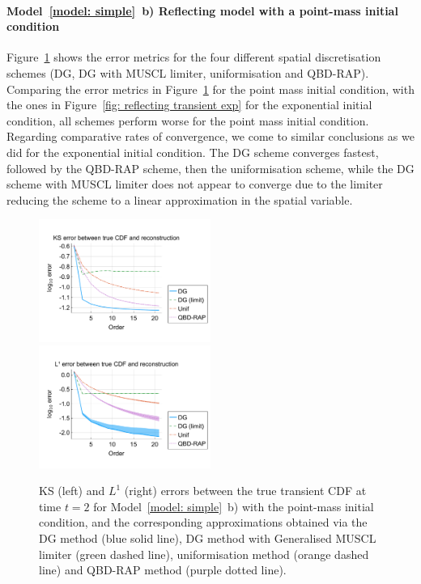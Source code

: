 \paragraph{Model~\ref{model: simple}~b) Reflecting model with a point-mass initial condition}
Figure~\ref{fig: reflecting transient pm} shows the error metrics for the four different spatial discretisation schemes (DG, DG with MUSCL limiter, uniformisation and QBD-RAP). Comparing the error metrics in Figure~\ref{fig: reflecting transient pm} for the point mass initial condition, with the ones in Figure~\ref{fig: reflecting transient exp} for the exponential initial condition, all schemes perform worse for the point mass initial condition. Regarding comparative rates of convergence, we come to similar conclusions as we did for the exponential initial condition. The DG scheme converges fastest, followed by the QBD-RAP scheme, then the uniformisation scheme, while the DG scheme with MUSCL limiter does not appear to converge due to the limiter reducing the scheme to a linear approximation in the spatial variable. %
\begin{figure}
	\centering
	\includegraphics[width=0.5\textwidth,trim={0.75cm 0.8cm 0.25cm 1.25cm},clip]{chapter6/figs/hitting_times_model/reflecting_model/transient_distribution/point_mass/ks_error_formatted.pdf}%
	\includegraphics[width=0.5\textwidth,trim={0.75cm 0.8cm 0.25cm 1.25cm},clip]{chapter6/figs/hitting_times_model/reflecting_model/transient_distribution/point_mass/l1_cdf_error_formatted.pdf}
	\caption{KS (left) and \(L^1\) (right) errors between the true transient CDF at time \(t=2\) for Model~\ref{model: simple}~b) with the point-mass initial condition, and the corresponding approximations obtained via the DG method (blue solid line), DG method with Generalised MUSCL limiter (green dashed line), uniformisation method (orange dashed line) and QBD-RAP method (purple dotted line).} 
	\label{fig: reflecting transient pm} 
\end{figure}
\FloatBarrier

